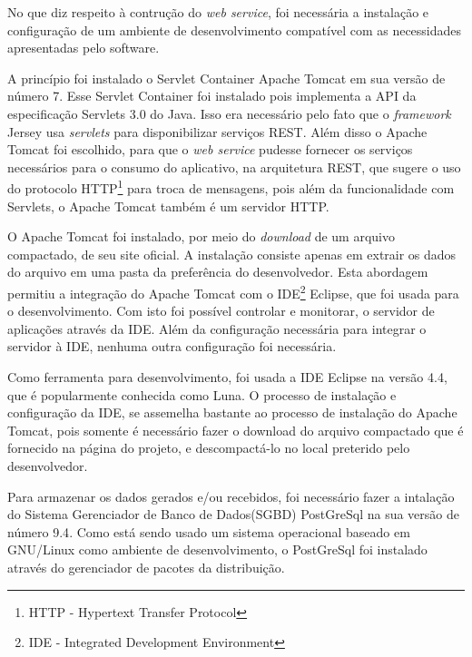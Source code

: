 	
	\par No que diz respeito à contrução do \textit{web service}, foi necessária a
instalação e configuração de um ambiente de desenvolvimento compatível com as
necessidades apresentadas pelo software.

	\par A princípio foi instalado o Servlet Container Apache Tomcat em sua versão
de número {7}. Esse Servlet Container foi instalado pois implementa a API da
especificação Servlets {3.0} do Java. Isso era necessário pelo fato que o
\textit{framework} Jersey usa \textit{servlets} para disponibilizar serviços
REST. Além disso o Apache Tomcat foi escolhido, para que o \textit{web service}
pudesse fornecer os serviços necessários para o consumo do aplicativo, na
arquitetura REST, que sugere o uso do protocolo HTTP\footnote{HTTP - Hypertext
Transfer Protocol} para troca de mensagens, pois além da funcionalidade com
Servlets, o Apache Tomcat também é um servidor HTTP.
	
	\par O Apache Tomcat foi instalado, por meio do \textit{download} de um
arquivo compactado, de seu site oficial. A instalação consiste apenas
em extrair os dados do arquivo em uma pasta da preferência do desenvolvedor.
Esta abordagem permitiu a integração do Apache Tomcat com o
IDE\footnote{IDE - Integrated Development Environment}
Eclipse, que foi usada para o desenvolvimento. Com isto foi possível controlar
e monitorar, o servidor de aplicações através da IDE. Além da configuração
necessária para integrar o servidor à IDE, nenhuma outra configuração foi
necessária.

	\par Como ferramenta para desenvolvimento, foi usada a IDE Eclipse na versão
{4.4}, que é popularmente conhecida como Luna. O processo de instalação e
configuração da IDE, se assemelha bastante ao processo de instalação do Apache
Tomcat, pois somente é necessário fazer o download do arquivo compactado que é
fornecido na página do projeto, e descompactá-lo no local preterido pelo
desenvolvedor.

	\par Para armazenar os dados gerados e/ou recebidos, foi necessário fazer a
intalação do Sistema Gerenciador de Banco de Dados(SGBD) PostGreSql na sua
versão de número {9.4}. Como está sendo usado um sistema operacional baseado em
GNU/Linux como ambiente de desenvolvimento, o PostGreSql foi instalado através
do gerenciador de pacotes da distribuição.
 
